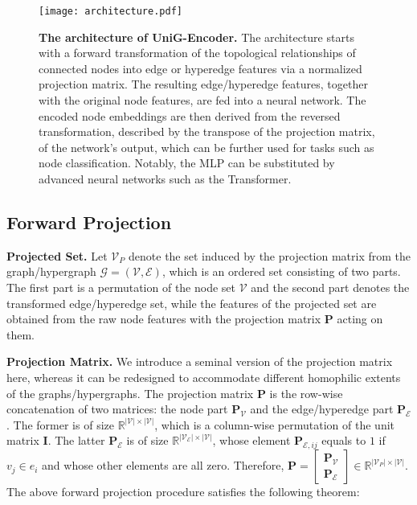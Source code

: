 \documentclass[review]{elsarticle}
\begin{document}
\begin{figure*}[htbp]
  \centering
  \texttt{[image: architecture.pdf]}
  \caption{\textbf{The architecture of UniG-Encoder.} The architecture starts with a forward transformation of the topological relationships of connected nodes into edge or hyperedge features via a normalized projection matrix. The resulting edge/hyperedge features, together with the original node features, are fed into a neural network. The encoded node embeddings are then derived from the reversed transformation, described by the transpose of the projection matrix, of the network's output, which can be further used for tasks such as node classification. Notably, the MLP can be substituted by advanced neural networks such as the Transformer.}
  \label{fig: architecture}
\end{figure*}

\subsection{Forward Projection}

\textbf{Projected Set.} Let $\mathcal{V}_P$ denote the set induced by the projection matrix from the graph/hypergraph $\mathcal{G}=(\mathcal{V},\mathcal{E})$, which is an ordered set consisting of two parts. The first part is a permutation of the node set $\mathcal{V}$ and the second part denotes the transformed edge/hyperedge set, while the features of the projected set are obtained from the raw node features with the projection matrix $\mathbf{P}$ acting on them.


\textbf{Projection Matrix.} We introduce a seminal version of the projection matrix here, whereas it can be redesigned to accommodate different homophilic extents of the graphs/hypergraphs. The projection matrix $\mathbf{P}$ is the row-wise concatenation of two matrices: the node part $\mathbf{P}_\mathcal{V}$ and the edge/hyperedge part $\mathbf{P}_\mathcal{E}$. The former is of size $\mathbb{R}^{|\mathcal{V}|\times|\mathcal{V}|}$, which is a column-wise permutation of the unit matrix $\mathbf{I}$. The latter $\mathbf{P}_\mathcal{E}$ is of size $\mathbb{R}^{|\mathcal{V}_\mathcal{E}|\times|\mathcal{V}|}$, whose element $\mathbf{P}_{\mathcal{E},ij}$ equals to $1$ if $v_j\in e_i$ and whose other elements are all zero. Therefore, $\mathbf{P}=\left[\begin{matrix}\mathbf{P}_\mathcal{V}\\\mathbf{P}_\mathcal{E}\end{matrix}\right]\in\mathbb{R}^{|\mathcal{V}_{P}|\times|\mathcal{V}|}$. The above forward projection procedure satisfies the following theorem:
\end{document}
